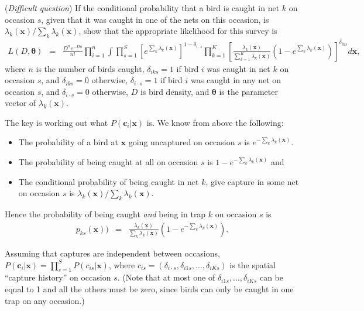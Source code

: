 \begin{questions}
\begin{parts}
\item (\textit{Difficult question}) If the conditional probability that a bird is caught in net $k$ on occasion $s$, given that it was caught in one of the nets on this occasion, is $\lambda_k(\mathbf{x})/\sum_k\lambda_k(\mathbf{x})$, show that the appropriate likelihood for this survey is
\begin{eqnarray*}
L(D,\boldsymbol{\theta})
&=&
\frac{D^ne^{-Da}}{n!}
\prod_{i=1}^n\int\prod_{s=1}^S
\left[e^{\sum_k\lambda_k(\mathbf{x})}\right]^{1-\delta_{i\cdot s}}
\prod_{k=1}^K
\left[\frac{\lambda_k(\mathbf{x})}{\sum_{k=1}^K\lambda_k(\mathbf{x})}
\left(1-e^{\sum_k\lambda_k(\mathbf{x})}\right)\right]^{\delta_{iks}}d\mathbf{x},
\end{eqnarray*}
\noindent
where $n$ is the number of birds caught, $\delta_{iks}=1$ if bird $i$ was caught in net $k$ on occasion $s$, and $\delta_{iks}=0$ otherwise, $\delta_{i\cdot s}=1$ if bird $i$ was caught in any net on occasion $s$, and $\delta_{i\cdot s}=0$ otherwise, $D$ is bird density, and $\boldsymbol{\theta}$ is the parameter vector of $\lambda_k(\mathbf{x})$.

{\begin{solution}
The key is working out what $P(\mathbf{c}_i|\mathbf{x})$ is. We know from above the following:
\begin{itemize}
\item The probability of a bird at $\mathbf{x}$ going uncaptured on occasion $s$ is $e^{-\sum_k\lambda_k(\mathbf{x})}$.
\item The probability of being caught at all on occasion $s$ is $1-e^{-\sum_k\lambda_k(\mathbf{x})}$ and 
\item The conditional probability of being caught in net $k$, give capture in some net on occasion $s$ is $\lambda_k(\mathbf{x})/\sum_k\lambda_k(\mathbf{x})$.
\end{itemize}
Hence the probability of being caught \textit{and} being in trap $k$ on occasion $s$ is
\begin{eqnarray}
p_{ks}(\mathbf{x}))&=&\frac{\lambda_k(\mathbf{x})}{\sum_k\lambda_k(\mathbf{x})}\left(1-e^{-\sum_k\lambda_k(\mathbf{x})}\right). \nonumber
\end{eqnarray}

Assuming that captures are independent between occasions, $P(\mathbf{c}_i|\mathbf{x})=\prod_{s=1}^SP(c_{is}|\mathbf{x})$, where $c_{is}=(\delta_{i\cdot s},\delta_{i1s},\ldots,\delta_{iKs})$ is the spatial ``capture history'' on occasion $s$. (Note that at most one of $\delta_{i1s},\ldots,\delta_{iKs}$ can be equal to 1 and all the others must be zero, since birds can only be caught in one trap on any occasion.)


\end{solution}}
\end{parts}
\end{questions}

